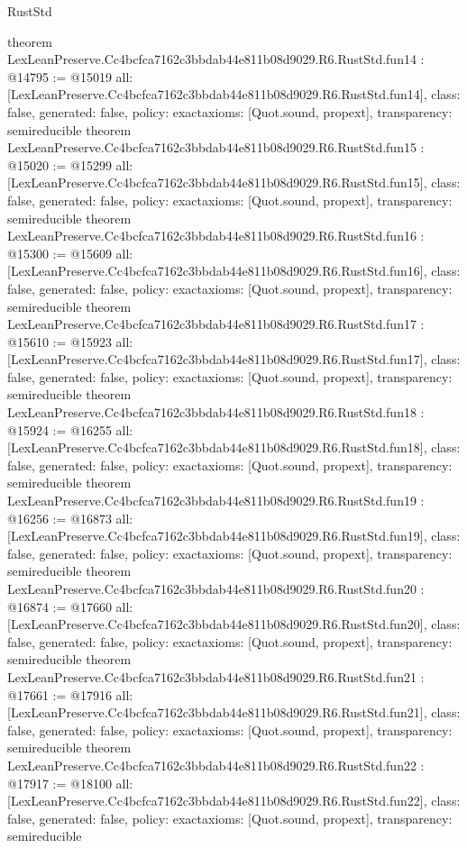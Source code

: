 \begin{lexlean}{RustStd}
\begin{coremodule}
{}
theorem LexLeanPreserve.Cc4bcfca7162c3bbdab44e811b08d9029.R6.RustStd.fun14 : @14795 := @15019 {
  all: [LexLeanPreserve.Cc4bcfca7162c3bbdab44e811b08d9029.R6.RustStd.fun14],
  class: false,
  generated: false,
  policy: exact{axioms: [Quot.sound, propext]},
  transparency: semireducible
}
theorem LexLeanPreserve.Cc4bcfca7162c3bbdab44e811b08d9029.R6.RustStd.fun15 : @15020 := @15299 {
  all: [LexLeanPreserve.Cc4bcfca7162c3bbdab44e811b08d9029.R6.RustStd.fun15],
  class: false,
  generated: false,
  policy: exact{axioms: [Quot.sound, propext]},
  transparency: semireducible
}
theorem LexLeanPreserve.Cc4bcfca7162c3bbdab44e811b08d9029.R6.RustStd.fun16 : @15300 := @15609 {
  all: [LexLeanPreserve.Cc4bcfca7162c3bbdab44e811b08d9029.R6.RustStd.fun16],
  class: false,
  generated: false,
  policy: exact{axioms: [Quot.sound, propext]},
  transparency: semireducible
}
theorem LexLeanPreserve.Cc4bcfca7162c3bbdab44e811b08d9029.R6.RustStd.fun17 : @15610 := @15923 {
  all: [LexLeanPreserve.Cc4bcfca7162c3bbdab44e811b08d9029.R6.RustStd.fun17],
  class: false,
  generated: false,
  policy: exact{axioms: [Quot.sound, propext]},
  transparency: semireducible
}
theorem LexLeanPreserve.Cc4bcfca7162c3bbdab44e811b08d9029.R6.RustStd.fun18 : @15924 := @16255 {
  all: [LexLeanPreserve.Cc4bcfca7162c3bbdab44e811b08d9029.R6.RustStd.fun18],
  class: false,
  generated: false,
  policy: exact{axioms: [Quot.sound, propext]},
  transparency: semireducible
}
theorem LexLeanPreserve.Cc4bcfca7162c3bbdab44e811b08d9029.R6.RustStd.fun19 : @16256 := @16873 {
  all: [LexLeanPreserve.Cc4bcfca7162c3bbdab44e811b08d9029.R6.RustStd.fun19],
  class: false,
  generated: false,
  policy: exact{axioms: [Quot.sound, propext]},
  transparency: semireducible
}
theorem LexLeanPreserve.Cc4bcfca7162c3bbdab44e811b08d9029.R6.RustStd.fun20 : @16874 := @17660 {
  all: [LexLeanPreserve.Cc4bcfca7162c3bbdab44e811b08d9029.R6.RustStd.fun20],
  class: false,
  generated: false,
  policy: exact{axioms: [Quot.sound, propext]},
  transparency: semireducible
}
theorem LexLeanPreserve.Cc4bcfca7162c3bbdab44e811b08d9029.R6.RustStd.fun21 : @17661 := @17916 {
  all: [LexLeanPreserve.Cc4bcfca7162c3bbdab44e811b08d9029.R6.RustStd.fun21],
  class: false,
  generated: false,
  policy: exact{axioms: [Quot.sound, propext]},
  transparency: semireducible
}
theorem LexLeanPreserve.Cc4bcfca7162c3bbdab44e811b08d9029.R6.RustStd.fun22 : @17917 := @18100 {
  all: [LexLeanPreserve.Cc4bcfca7162c3bbdab44e811b08d9029.R6.RustStd.fun22],
  class: false,
  generated: false,
  policy: exact{axioms: [Quot.sound, propext]},
  transparency: semireducible
}
\end{coremodule}
\end{lexlean}
